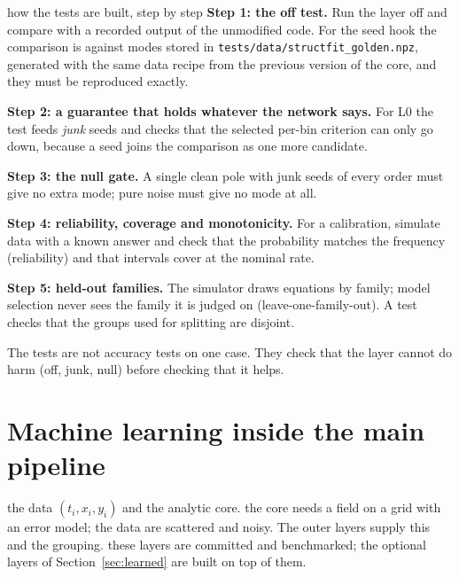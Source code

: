 \begin{explained}{how the tests are built, step by step}
\textbf{Step 1: the off test.} Run the layer off and compare with a recorded output of the unmodified code. For the seed hook the comparison is against modes stored in \texttt{tests/data/structfit\_golden.npz}, generated with the same data recipe from the previous version of the core, and they must be reproduced exactly.

\medskip\textbf{Step 2: a guarantee that holds whatever the network says.} For L0 the test feeds \emph{junk} seeds and checks that the selected per-bin criterion can only go down, because a seed joins the comparison as one more candidate.

\medskip\textbf{Step 3: the null gate.} A single clean pole with junk seeds of every order must give no extra mode; pure noise must give no mode at all.

\medskip\textbf{Step 4: reliability, coverage and monotonicity.} For a calibration, simulate data with a known answer and check that the probability matches the frequency (reliability) and that intervals cover at the nominal rate.

\medskip\textbf{Step 5: held-out families.} The simulator draws equations by family; model selection never sees the family it is judged on (leave-one-family-out). A test checks that the groups used for splitting are disjoint.
\end{explained}

\begin{takeaway}
The tests are not accuracy tests on one case. They check that the layer cannot do harm (off, junk, null) before checking that it helps.
\end{takeaway}

\section{Machine learning inside the main pipeline}\label{sec:main}
\sectionbrief
{the data $(t_i,x_i,y_i)$ and the analytic core.}
{the core needs a field on a grid with an error model; the data are scattered and noisy. The outer layers supply this and the grouping.}
{these layers are committed and benchmarked; the optional layers of Section~\ref{sec:learned} are built on top of them.}

